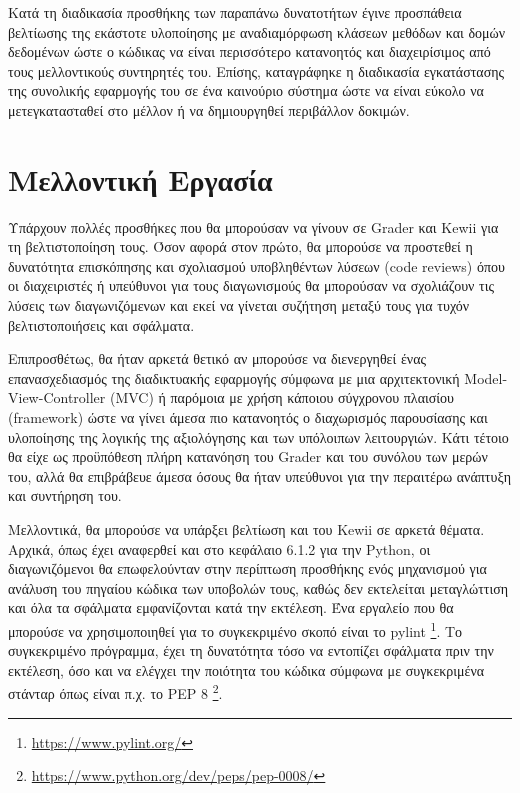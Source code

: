 \documentclass[diploma]{softlab-thesis}
\begin{document}
Κατά τη διαδικασία προσθήκης των παραπάνω δυνατοτήτων έγινε προσπάθεια
βελτίωσης της εκάστοτε υλοποίησης με αναδιαμόρφωση κλάσεων μεθόδων και δομών
δεδομένων ώστε ο κώδικας να είναι περισσότερο κατανοητός και διαχειρίσιμος από
τους μελλοντικούς συντηρητές του. Επίσης, καταγράφηκε η διαδικασία εγκατάστασης
της συνολικής εφαρμογής του σε ένα καινούριο σύστημα ώστε να είναι εύκολο να
μετεγκατασταθεί στο μέλλον ή να δημιουργηθεί περιβάλλον δοκιμών.

\section{Μελλοντική Εργασία}

Υπάρχουν πολλές προσθήκες που θα μπορούσαν να γίνουν σε Grader και Kewii για τη
βελτιστοποίηση τους. Όσον αφορά στον πρώτο, θα μπορούσε να προστεθεί η δυνατότητα
επισκόπησης και σχολιασμού υποβληθέντων λύσεων (code reviews) όπου οι διαχειριστές
ή υπεύθυνοι για τους διαγωνισμούς θα μπορούσαν να σχολιάζουν τις λύσεις των
διαγωνιζόμενων και εκεί να γίνεται συζήτηση μεταξύ τους για τυχόν βελτιστοποιήσεις
και σφάλματα.

\bigskip

Επιπροσθέτως, θα ήταν αρκετά θετικό αν μπορούσε να διενεργηθεί ένας
επανασχεδιασμός της διαδικτυακής εφαρμογής σύμφωνα με μια αρχιτεκτονική
Model-View-Controller (MVC) ή παρόμοια με χρήση κάποιου σύγχρονου πλαισίου
(framework) ώστε να γίνει άμεσα πιο κατανοητός ο διαχωρισμός παρουσίασης και
υλοποίησης της λογικής της αξιολόγησης και των υπόλοιπων λειτουργιών. Κάτι
τέτοιο θα είχε ως προϋπόθεση πλήρη κατανόηση του Grader και του συνόλου των
μερών του, αλλά θα επιβράβευε άμεσα όσους θα ήταν υπεύθυνοι για την περαιτέρω
ανάπτυξη και συντήρηση του.

\bigskip

Μελλοντικά, θα μπορούσε να υπάρξει βελτίωση και του Kewii σε αρκετά θέματα.
Αρχικά, όπως έχει αναφερθεί και στο κεφάλαιο 6.1.2 για την Python, οι
διαγωνιζόμενοι θα επωφελούνταν στην περίπτωση προσθήκης ενός μηχανισμού για
ανάλυση του πηγαίου κώδικα των υποβολών τους, καθώς δεν εκτελείται μεταγλώττιση
και όλα τα σφάλματα εμφανίζονται κατά την εκτέλεση. Ένα εργαλείο που θα
μπορούσε να χρησιμοποιηθεί για το συγκεκριμένο σκοπό είναι το pylint
\footnote{\url{https://www.pylint.org/}}. Το συγκεκριμένο πρόγραμμα, έχει τη
δυνατότητα τόσο να εντοπίζει σφάλματα πριν την εκτέλεση, όσο και να ελέγχει την
ποιότητα του κώδικα σύμφωνα με συγκεκριμένα στάνταρ όπως είναι π.χ. το PEP 8
\footnote{\url{https://www.python.org/dev/peps/pep-0008/}}.
\end{document}
